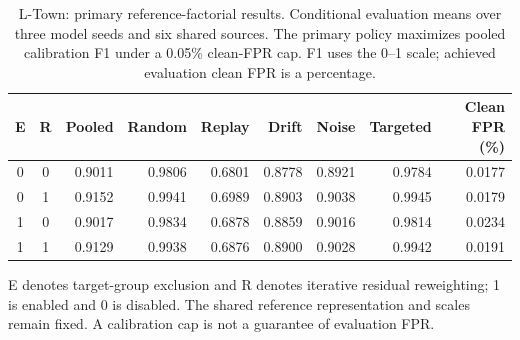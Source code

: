 \begin{table}[tbp]
\centering\small
\setlength{\tabcolsep}{4pt}
\renewcommand{\arraystretch}{1.1}
\caption[L-Town: primary reference-factorial results]{L-Town: primary reference-factorial results. Conditional evaluation means over three model seeds and six shared sources. The primary policy maximizes pooled calibration F1 under a 0.05\% clean-FPR cap. F1 uses the 0--1 scale; achieved evaluation clean FPR is a percentage.}
\label{tab:factorial_primary_ltown}
\begin{tabular}{@{}ccrrrrrrr@{}}
\toprule
E & R & Pooled & Random & Replay & Drift & Noise & Targeted & \shortstack{Clean FPR\\(\%)} \\
\midrule
0 & 0 & 0.9011 & 0.9806 & 0.6801 & 0.8778 & 0.8921 & 0.9784 & 0.0177 \\
0 & 1 & 0.9152 & 0.9941 & 0.6989 & 0.8903 & 0.9038 & 0.9945 & 0.0179 \\
1 & 0 & 0.9017 & 0.9834 & 0.6878 & 0.8859 & 0.9016 & 0.9814 & 0.0234 \\
1 & 1 & 0.9129 & 0.9938 & 0.6876 & 0.8900 & 0.9028 & 0.9942 & 0.0191 \\
\bottomrule
\end{tabular}
\par\smallskip
\begin{minipage}{\linewidth}\footnotesize E denotes target-group exclusion and R denotes iterative residual reweighting; 1 is enabled and 0 is disabled. The shared reference representation and scales remain fixed. A calibration cap is not a guarantee of evaluation FPR.\end{minipage}
\end{table}

